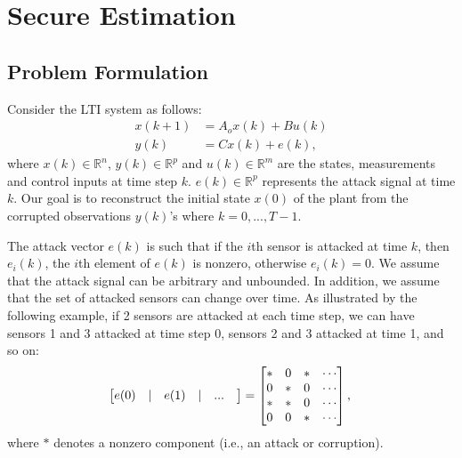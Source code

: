 \documentclass[../../thesis.tex]{subfiles}
\begin{document}



\section{Secure Estimation}\label{sec:SE}

\subsection{Problem Formulation}
Consider the LTI system as follows:
\begin{equation}
\begin{aligned}
x(k+1) &= A_o x(k) + B u(k) \\
y(k) &= C x(k) + e(k),
\end{aligned} 
\label{eq:system_model_se}
\end{equation} 
where $x(k) \in \mathbb{R}^n$, $y(k) \in \mathbb{R}^p$ and $u(k) \in \mathbb{R}^m$ are the states, measurements and control inputs at time step $k$. $e(k) \in \mathbb{R}^p$ represents the attack signal at time $k$. Our goal is to reconstruct the initial state $x(0)$ of the plant from the corrupted observations $y(k)$'s where $k=0,...,T-1$.

The attack vector $e(k)$ is such that if the $i$th sensor is attacked at time $k$, then $e_i(k)$, the $i$th element of $e(k)$ is nonzero, otherwise $e_i(k) = 0$. We assume that the attack signal can be arbitrary and unbounded. In addition, we assume that the set of attacked sensors can change over time. As illustrated by the following example, if 2 sensors are attacked at each time step, we can have sensors 1 and 3 attacked at time step 0, sensors 2 and 3 attacked at time 1, and so on:
\begin{equation}
	\begin{bmatrix} e(0)  & \lvert & e(1) & \lvert &  ...  & \end{bmatrix} 
	= \begin{bmatrix} * & 0 & * & \cdots \\
					       0 & * & 0 & \cdots \\
					       * & * & 0 & \cdots \\
					       0 & 0 & * &\cdots 
			\end{bmatrix}, \nonumber \\
\end{equation}
where $*$ denotes a nonzero component (i.e., an attack or corruption). 
\end{document}
